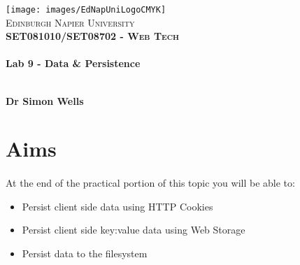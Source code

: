 \documentclass[10pt, a4paper, twosize]{article}
\begin{document}

\begin{titlepage}
\vspace*{5cm}
\begin{center}
\texttt{[image: images/EdNapUniLogoCMYK]}~\\[1cm]

\textsc{\Large Edinburgh Napier University}\\[1.5cm]

\textsc{\LARGE \bfseries SET081010/SET08702 - Web Tech}\\[0.5cm]

\hrulefill \\[0.4cm]
{\huge \bfseries Lab 9 - Data \& Persistence \\[0.4cm] }
\hrulefill \\[1.5cm]

\begin{minipage}{0.4\textwidth}
\begin{flushleft} \large
\textbf{Dr Simon Wells} \\
\end{flushleft}
\end{minipage}

\vfill

\end{center}
\end{titlepage}




%

\section*{Aims}
\paragraph{} At the end of the practical portion of this topic you will be able to:

\begin{itemize}
\item Persist client side data using HTTP Cookies
\item Persist client side key:value data using Web Storage
\item Persist data to the filesystem
\end{itemize}
\end{document}
